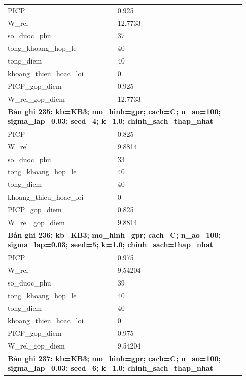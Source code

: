\begin{longtable}{p{0.43\linewidth}p{0.50\linewidth}}
PICP & 0.925 \\
W\_\allowbreak rel & 12.7733 \\
so\_\allowbreak duoc\_\allowbreak phu & 37 \\
tong\_\allowbreak khoang\_\allowbreak hop\_\allowbreak le & 40 \\
tong\_\allowbreak diem & 40 \\
khoang\_\allowbreak thieu\_\allowbreak hoac\_\allowbreak loi & 0 \\
PICP\_\allowbreak gop\_\allowbreak diem & 0.925 \\
W\_\allowbreak rel\_\allowbreak gop\_\allowbreak diem & 12.7733 \\
\midrule
\multicolumn{2}{p{0.95\linewidth}}{\textbf{Bản ghi 235: kb=KB3; mo\_hinh=gpr; cach=C; n\_ao=100; sigma\_lap=0.03; seed=4; k=1.0; chinh\_sach=thap\_nhat}} \\
PICP & 0.825 \\
W\_\allowbreak rel & 9.8814 \\
so\_\allowbreak duoc\_\allowbreak phu & 33 \\
tong\_\allowbreak khoang\_\allowbreak hop\_\allowbreak le & 40 \\
tong\_\allowbreak diem & 40 \\
khoang\_\allowbreak thieu\_\allowbreak hoac\_\allowbreak loi & 0 \\
PICP\_\allowbreak gop\_\allowbreak diem & 0.825 \\
W\_\allowbreak rel\_\allowbreak gop\_\allowbreak diem & 9.8814 \\
\midrule
\multicolumn{2}{p{0.95\linewidth}}{\textbf{Bản ghi 236: kb=KB3; mo\_hinh=gpr; cach=C; n\_ao=100; sigma\_lap=0.03; seed=5; k=1.0; chinh\_sach=thap\_nhat}} \\
PICP & 0.975 \\
W\_\allowbreak rel & 9.54204 \\
so\_\allowbreak duoc\_\allowbreak phu & 39 \\
tong\_\allowbreak khoang\_\allowbreak hop\_\allowbreak le & 40 \\
tong\_\allowbreak diem & 40 \\
khoang\_\allowbreak thieu\_\allowbreak hoac\_\allowbreak loi & 0 \\
PICP\_\allowbreak gop\_\allowbreak diem & 0.975 \\
W\_\allowbreak rel\_\allowbreak gop\_\allowbreak diem & 9.54204 \\
\midrule
\multicolumn{2}{p{0.95\linewidth}}{\textbf{Bản ghi 237: kb=KB3; mo\_hinh=gpr; cach=C; n\_ao=100; sigma\_lap=0.03; seed=6; k=1.0; chinh\_sach=thap\_nhat}} \\

\end{longtable}

